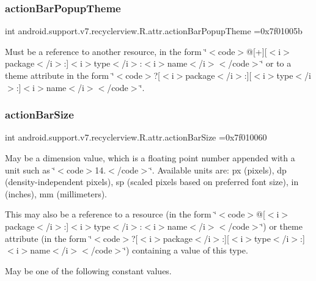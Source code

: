 \subsubsection{\texorpdfstring{action\+Bar\+Popup\+Theme}{actionBarPopupTheme}}
{\footnotesize\ttfamily int android.\+support.\+v7.\+recyclerview.\+R.\+attr.\+action\+Bar\+Popup\+Theme =0x7f01005b\hspace{0.3cm}{\ttfamily [static]}}

Must be a reference to another resource, in the form \char`\"{}$<$code$>$@\mbox{[}+\mbox{]}\mbox{[}$<$i$>$package$<$/i$>$\+:\mbox{]}$<$i$>$type$<$/i$>$\+:$<$i$>$name$<$/i$>$$<$/code$>$\char`\"{} or to a theme attribute in the form \char`\"{}$<$code$>$?\mbox{[}$<$i$>$package$<$/i$>$\+:\mbox{]}\mbox{[}$<$i$>$type$<$/i$>$\+:\mbox{]}$<$i$>$name$<$/i$>$$<$/code$>$\char`\"{}. \mbox{\label{classandroid_1_1support_1_1v7_1_1recyclerview_1_1R_1_1attr_ab6e3a55db3c5f1c2f85fde80a7a441d7}} 
\subsubsection{\texorpdfstring{action\+Bar\+Size}{actionBarSize}}
{\footnotesize\ttfamily int android.\+support.\+v7.\+recyclerview.\+R.\+attr.\+action\+Bar\+Size =0x7f010060\hspace{0.3cm}{\ttfamily [static]}}

May be a dimension value, which is a floating point number appended with a unit such as \char`\"{}$<$code$>$14.\+5sp$<$/code$>$\char`\"{}. Available units are\+: px (pixels), dp (density-\/independent pixels), sp (scaled pixels based on preferred font size), in (inches), mm (millimeters). 

This may also be a reference to a resource (in the form \char`\"{}$<$code$>$@\mbox{[}$<$i$>$package$<$/i$>$\+:\mbox{]}$<$i$>$type$<$/i$>$\+:$<$i$>$name$<$/i$>$$<$/code$>$\char`\"{}) or theme attribute (in the form \char`\"{}$<$code$>$?\mbox{[}$<$i$>$package$<$/i$>$\+:\mbox{]}\mbox{[}$<$i$>$type$<$/i$>$\+:\mbox{]}$<$i$>$name$<$/i$>$$<$/code$>$\char`\"{}) containing a value of this type. 

May be one of the following constant values.

